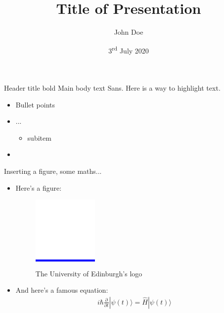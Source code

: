 \documentclass{beamer}
\title[Insert Title (short version of title)]{Title of Presentation}
\author{John Doe}
\date{3\textsuperscript{rd} July 2020}
\begin{document}
\begin{frame}
  \titlepage
\end{frame}

\begin{frame}[t]{Header title bold}
  Main body text Sans. Here is a way to \alert{highlight text}.
  \label{sec:Test1}
  \begin{itemize}
  \item Bullet points
  \item ...
    \begin{itemize}
    \item subitem
    \end{itemize}
  \item \lipsum[2]
  \end{itemize}
\end{frame}



\begin{frame}{Inserting a figure, some maths...}
  \begin{itemize}
  \item   Here's a figure:
    \begin{figure}[h]
      \centering
      \colorbox{blue}{\includegraphics[width=.13\linewidth]{Images/edinburgh-logo}}
      \caption{The University of Edinburgh's logo}
      \label{fig:edinburgh-logo}
    \end{figure}
  \item
    And here's a famous equation:
  \begin{eqnarray}
    \label{eq:schroedinger}
    i\hbar {\frac {\partial }{\partial t}}|\psi (t)\rangle ={\hat {H}}|\psi (t)\rangle
  \end{eqnarray}
  \end{itemize}
\end{frame}
\end{document}
